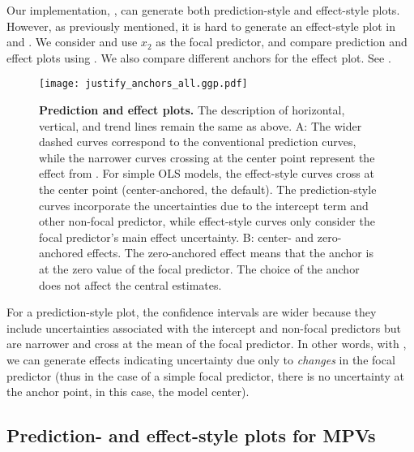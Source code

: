 Our implementation, , can generate both prediction-style and effect-style plots. However, as previously mentioned, it is hard to generate an effect-style plot in  and . We consider  and use $x_2$ as the focal predictor, and compare prediction and effect plots using . We also compare different anchors for the effect plot. See .
%
\begin{figure}
\begin{center}
\texttt{[image: justify\_anchors\_all.ggp.pdf]}
\end{center}
\caption{{\bf Prediction and effect plots.} The description of horizontal, vertical, and trend lines remain the same as above. A: The wider dashed curves correspond to the conventional prediction curves, while the narrower curves crossing at the center point represent the effect from . For simple OLS models, the effect-style curves cross at the center point (center-anchored, the default). The prediction-style curves incorporate the uncertainties due to the intercept term and other non-focal predictor, while effect-style curves only consider the focal predictor's main effect uncertainty. B: center- and zero- anchored effects. The zero-anchored effect means that the anchor is at the zero value of the focal predictor. The choice of the anchor does not affect the central estimates.}
\label{fig:justify_ci_plots}
\end{figure}
%
For a prediction-style plot, the confidence intervals are wider because they include uncertainties associated with the intercept and non-focal predictors but are narrower and cross at the mean of the focal predictor. In other words, with , we can generate effects indicating uncertainty due only to \emph{changes} in the focal predictor (thus in the case of a simple focal predictor, there is no uncertainty at the anchor point, in this case, the model center).

\subsection{Prediction- and effect-style plots for MPVs}

